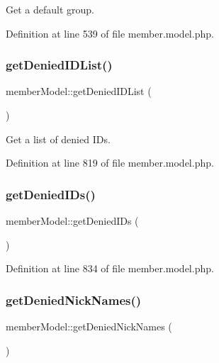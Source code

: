 Get a default group. 



Definition at line 539 of file member.\+model.\+php.

\mbox{\label{classmemberModel_ad6bb73cc72412955c289f4f695b8d0c9}} 
\subsubsection{\texorpdfstring{get\+Denied\+I\+D\+List()}{getDeniedIDList()}}
{\footnotesize\ttfamily member\+Model\+::get\+Denied\+I\+D\+List (\begin{DoxyParamCaption}{ }\end{DoxyParamCaption})}



Get a list of denied I\+Ds. 



Definition at line 819 of file member.\+model.\+php.

\mbox{\label{classmemberModel_af8bd4c178bbae831f02b5419bc0e02ea}} 
\subsubsection{\texorpdfstring{get\+Denied\+I\+Ds()}{getDeniedIDs()}}
{\footnotesize\ttfamily member\+Model\+::get\+Denied\+I\+Ds (\begin{DoxyParamCaption}{ }\end{DoxyParamCaption})}



Definition at line 834 of file member.\+model.\+php.

\mbox{\label{classmemberModel_ac318ffed61009f4b2d993daee7788072}} 
\subsubsection{\texorpdfstring{get\+Denied\+Nick\+Names()}{getDeniedNickNames()}}
{\footnotesize\ttfamily member\+Model\+::get\+Denied\+Nick\+Names (\begin{DoxyParamCaption}{ }\end{DoxyParamCaption})}



